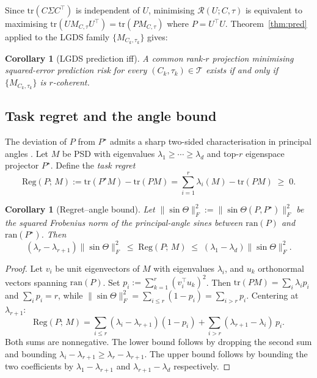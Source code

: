 \documentclass[final,3p,times]{elsarticle}
\newtheorem{corollary}[theorem]{Corollary}
\newcommand{\tr}{\mathrm{tr}}
\newcommand{\ran}{\mathrm{ran}}
\newcommand{\Reg}{\mathrm{Reg}}
\begin{document}
Since $\tr(C\Sigma C^\top)$ is independent of $U$, minimising
$\mathcal{R}(U;C,\tau)$ is equivalent to maximising
$\tr(U M_{C,\tau} U^\top)=\tr(P M_{C,\tau})$ where $P=U^\top U$.
Theorem~\ref{thm:pred} applied to the LGDS family
$\{M_{C_k,\tau_k}\}$ gives:

\begin{corollary}[LGDS prediction iff]
A common rank-$r$ projection minimising squared-error prediction risk
for every $(C_k,\tau_k)\in\mathcal{T}$ exists if and only if
$\{M_{C_k,\tau_k}\}$ is $r$-coherent.
\end{corollary}

\subsection{Task regret and the angle bound}

The deviation of $P$ from $P^\star$ admits a sharp two-sided
characterisation in principal angles \cite{BjorckGolub1973}.
Let $M$ be PSD with eigenvalues $\lambda_1\ge\cdots\ge\lambda_d$ and
top-$r$ eigenspace projector $P^\star$.
Define the \emph{task regret}
\begin{equation}\label{eq:regret}
\Reg(P;\,M) := \tr(P^\star M) - \tr(P M)
= \sum_{i=1}^r\lambda_i(M)-\tr(P M)\;\ge\;0.
\end{equation}

\begin{corollary}[Regret--angle bound]\label{cor:regretbound}
Let $\|\sin\Theta\|_F^2 := \|\sin\Theta(P,P^\star)\|_F^2$ be the squared
Frobenius norm of the principal-angle sines between $\ran(P)$ and
$\ran(P^\star)$.
Then
\begin{equation}\label{eq:regretbound}
(\lambda_r-\lambda_{r+1})\|\sin\Theta\|_F^2
\;\le\;\Reg(P;\,M)\;\le\;
(\lambda_1-\lambda_d)\|\sin\Theta\|_F^2.
\end{equation}
\end{corollary}

\begin{proof}
Let $v_i$ be unit eigenvectors of $M$ with eigenvalues $\lambda_i$, and
$u_k$ orthonormal vectors spanning $\ran(P)$.
Set $p_i:=\sum_{k=1}^r(v_i^\top u_k)^2$.
Then $\tr(PM)=\sum_i\lambda_i p_i$ and $\sum_i p_i=r$, while
$\|\sin\Theta\|_F^2=\sum_{i\le r}(1-p_i)=\sum_{i>r}p_i$.
Centering at $\lambda_{r+1}$:
\[
\Reg(P;\,M)
=\sum_{i\le r}(\lambda_i-\lambda_{r+1})(1-p_i)
+\sum_{i>r}(\lambda_{r+1}-\lambda_i)\,p_i.
\]
Both sums are nonnegative.
The lower bound follows by dropping the second sum and bounding
$\lambda_i-\lambda_{r+1}\ge\lambda_r-\lambda_{r+1}$.
The upper bound follows by bounding the two coefficients by $\lambda_1
-\lambda_{r+1}$ and $\lambda_{r+1}-\lambda_d$ respectively.
\end{proof}
\end{document}
